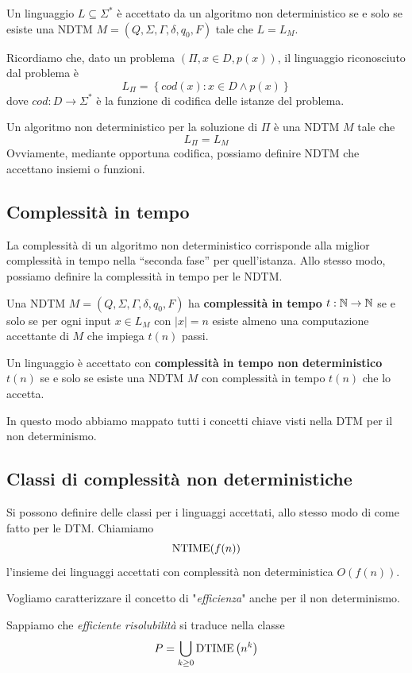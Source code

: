 Un linguaggio $L \subseteq \Sigma^\ast$ è accettato da un algoritmo non deterministico se e solo se esiste una NDTM $M = (Q, \Sigma, \Gamma, \delta, q_0, F)$ tale che $L = L_M$.

Ricordiamo che, dato un problema $(\Pi, x \in D, p(x))$, il linguaggio riconosciuto dal problema è
$$ L_\Pi = \left\{cod(x): x \in D \wedge p(x) \right\} $$
dove $cod: D \rightarrow \Sigma^\ast$ è la funzione di codifica delle istanze del problema.

Un algoritmo non deterministico per la soluzione di $\Pi$ è una NDTM $M$ tale che
$$ L_\Pi = L_M $$
Ovviamente, mediante opportuna codifica, possiamo definire NDTM che accettano insiemi o funzioni.

\subsection{Complessità in tempo}

La complessità di un algoritmo non deterministico corrisponde alla miglior complessità in tempo nella ``seconda fase'' per quell'istanza. Allo stesso modo, possiamo definire la complessità in tempo per le NDTM.

Una NDTM $M = (Q, \Sigma, \Gamma, \delta, q_0, F)$ ha \textbf{complessità in tempo} $t: \mathbb{N} \rightarrow \mathbb{N}$ se e solo se per ogni input $x \in L_M$ con $|x| = n$ esiste almeno una computazione accettante di $M$ che impiega $t(n)$ passi.

Un linguaggio è accettato con \textbf{complessità in tempo non deterministico} $t(n)$ se e solo se esiste una NDTM $M$ con complessità in tempo $t(n)$ che lo accetta.

In questo modo abbiamo mappato tutti i concetti chiave visti nella DTM per il non determinismo.

\subsection{Classi di complessità non deterministiche}

Si possono definire delle classi per i linguaggi accettati, allo stesso modo di come fatto per le DTM. Chiamiamo
$$ \text{NTIME} (f(n)) $$
l'insieme dei linguaggi accettati con complessità non deterministica $O(f(n))$.

Vogliamo caratterizzare il concetto di "\textit{efficienza}" anche per il non determinismo.

Sappiamo che \textit{efficiente risolubilità} si traduce nella classe 
$$ P = \bigcup_{k \geq 0} \text{DTIME} \left(n^k\right) $$


